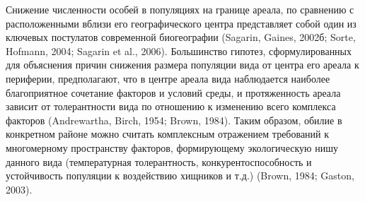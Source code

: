
Снижение численности особей в популяциях на границе ареала, по сравнению с расположенными вблизи его географического центра представляет собой один из ключевых постулатов современной биогеографии (Sagarin, Gaines, 2002б; Sorte, Hofmann, 2004; Sagarin et al., 2006). 
Большинство гипотез, сформулированных для объяснения причин снижения размера популяции вида от центра его ареала к периферии, предполагают, что в центре ареала вида наблюдается наиболее благоприятное сочетание факторов и условий среды, и протяженность ареала зависит от толерантности вида по отношению к изменению всего комплекса факторов (Andrewartha, Birch, 1954; Brown, 1984). 
Таким образом, обилие в конкретном районе можно считать комплексным отражением требований к многомерному пространству факторов, формирующему экологическую нишу данного вида (температурная толерантность, конкурентоспособность и устойчивость популяции к воздействию хищников и т.д.) (Brown, 1984; Gaston, 2003).
